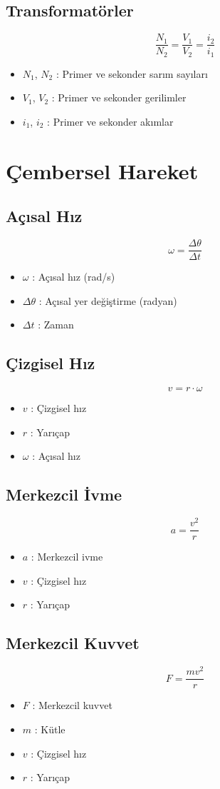 \documentclass[a4paper, 11pt, titlepage]{article}
\begin{document}
\subsection{Transformatörler}
\[
\frac{N_1}{N_2} = \frac{V_1}{V_2} = \frac{i_2}{i_1}
\]
\begin{itemize}
  \item $N_1$, $N_2$ : Primer ve sekonder sarım sayıları
  \item $V_1$, $V_2$ : Primer ve sekonder gerilimler
  \item $i_1$, $i_2$ : Primer ve sekonder akımlar
\end{itemize}
\section{Çembersel Hareket}
\subsection{Açısal Hız}
\[
\omega = \frac{\Delta \theta}{\Delta t}
\]
\begin{itemize}
  \item $\omega$ : Açısal hız (rad/s)
  \item $\Delta \theta$ : Açısal yer değiştirme (radyan)
  \item $\Delta t$ : Zaman
\end{itemize}

\subsection{Çizgisel Hız}
\[
v = r \cdot \omega
\]
\begin{itemize}
  \item $v$ : Çizgisel hız
  \item $r$ : Yarıçap
  \item $\omega$ : Açısal hız
\end{itemize}

\subsection{Merkezcil İvme}
\[
a = \frac{v^2}{r}
\]
\begin{itemize}
  \item $a$ : Merkezcil ivme
  \item $v$ : Çizgisel hız
  \item $r$ : Yarıçap
\end{itemize}

\subsection{Merkezcil Kuvvet}
\[
F = \frac{m v^2}{r}
\]
\begin{itemize}
  \item $F$ : Merkezcil kuvvet
  \item $m$ : Kütle
  \item $v$ : Çizgisel hız
  \item $r$ : Yarıçap
\end{itemize}
\end{document}

